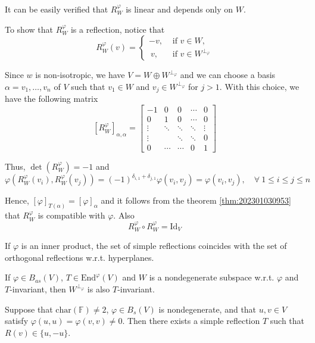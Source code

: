 It can be easily verified that $R_W^\varphi$ is linear and depends only on $W$. 

To show that $R_W^\varphi$ is a reflection, notice that 
\[
  R_W^\varphi(v) = \begin{cases}
    -v, & \text{ if } v \in W, \\
    ~v, & \text{ if } v \in W^{\perp_\varphi}
  \end{cases}
\]

Since $w$ is non-isotropic, we have $V = W \oplus W^{\perp_\varphi}$ and we can choose a basis $\alpha = v_1, \ldots, v_n$ of $V$ such that $v_1 \in W$ and $v_j \in W^{\perp_\varphi}$ for $j > 1$. With this choice, we have the following matrix 
\[
  [R_W^\varphi]_{\alpha, \alpha} = \begin{bmatrix}
    -1 & 0 & 0 & \cdots & 0 \\
    0  & 1 & 0 & \cdots & 0 \\
    \vdots & \ddots & \ddots & \ddots & \vdots \\ 
    \vdots & & \ddots & \ddots & 0 \\
    0 & \cdots & \cdots & 0 & 1
  \end{bmatrix}
\]

Thus, $\det(R_W^\varphi) = -1$ and 
\[
  \varphi(R_W^\varphi(v_i), R_W^\varphi(v_j)) = (-1)^{\delta_{i, 1} + \delta_{j,1}} \varphi(v_i, v_j) = \varphi(v_i, v_j), \quad \forall~1 \leq i \leq j \leq n
\]

Hence, $[\varphi]_{T(\alpha)} = [\varphi]_\alpha$ and it follows from the theorem \ref{thm:202301030953} that $R_W^\varphi$ is compatible with $\varphi$. Also
\[
  R_W^\varphi \circ R_W^\varphi = \text{Id}_V
\]

If $\varphi$ is an inner product, the set of simple reflections coincides with the set of orthogonal reflections w.r.t. hyperplanes.

\begin{lemma}\label{lm:202301040856}
  If $\varphi \in B_{as}(V)$, $T \in \text{End}^\varphi(V)$ and $W$ is a nondegenerate subspace w.r.t. $\varphi$ and $T$-invariant, then $W^{\perp_\varphi}$ is also $T$-invariant. 
\end{lemma}

\begin{lemma}\label{lm:202301040857}
  Suppose that $\text{char}(\mathbb{F}) \neq 2$, $\varphi \in B_s(V)$ is nondegenerate, and that $u, v \in V$ satisfy $\varphi(u,u) = \varphi(v,v) \neq 0$. Then there exists a simple reflection $T$ such that $R(v) \in \{ u, -u \}$.
\end{lemma}

